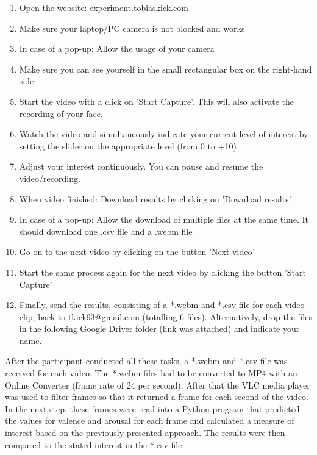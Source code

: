 \begin{enumerate}[noitemsep]
    \item Open the website: experiment.tobiaskick.com
    \item Make sure your laptop/PC camera is not blocked and works
    \item In case of a pop-up: Allow the usage of your camera
    \item Make sure you can see yourself in the small rectangular box on the right-hand side
    \item Start the video with a click on 'Start Capture'. This will also activate the recording of your face.
    \item Watch the video and simultaneously indicate your current level of interest by setting the slider on the appropriate level (from 0 to +10)
    \item Adjust your interest continuously. You can pause and resume the video/recording.
    \item When video finished: Download results by clicking on 'Download results'
    \item In case of a pop-up: Allow the download of multiple files at the same time. It should download one .csv file and a .webm file
    \item Go on to the next video by clicking on the button 'Next video'
    \item Start the same process again for the next video by clicking the button 'Start Capture'
    \item Finally, send the results, consisting of a *.webm and *.csv file for each video clip, back to tkick93@gmail.com (totalling 6 files). Alternatively, drop the files in the following Google Driver folder (link was attached) and indicate your name.
\end{enumerate}

\noindent After the participant conducted all these tasks, a *.webm and *.csv file was received for each video. The *.webm files had to be converted to MP4 with an Online Converter (frame rate of 24 per second). After that the VLC media player was used to filter frames so that it returned a frame for each second of the video.
\newline\newline
In the next step, these frames were read into a Python program that predicted the values for valence and arousal for each frame and calculated a measure of interest based on the previously presented approach. The results were then compared to the stated interest in the *.csv file.


